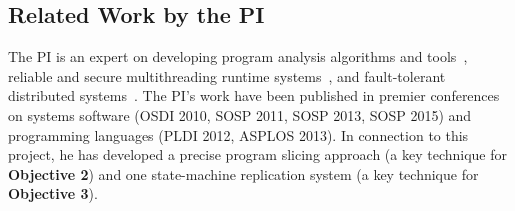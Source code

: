 % 


\vspace{-.15in}\subsection{Related Work by the PI} 
\label{sec:my-work}\vspace{-.075in}
% 

The PI is an expert on developing program analysis algorithms and 
tools~\cite{wu:pldi12, woodpecker:asplos13, repframe:apsys15}, reliable and 
secure multithreading runtime systems~\cite{smt:cacm, cui:tern:osdi10, 
peregrine:sosp11, parrot:sosp13}, and fault-tolerant distributed 
systems~\cite{crane:sosp15}. The PI's work have been published in 
premier conferences on systems software (OSDI 2010, SOSP 2011, SOSP 2013, SOSP 
2015) and programming languages (PLDI 2012, ASPLOS 2013). In connection to 
this project, he has developed a precise program slicing approach (a key 
technique for \textbf{Objective 2}) and one state-machine replication system (a key 
technique for \textbf{Objective 3}).


